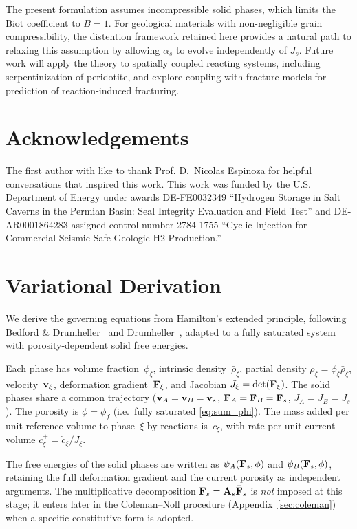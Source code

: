 \documentclass[11pt]{article}
\begin{document}
The present formulation assumes incompressible solid phases, which limits the Biot coefficient to $B = 1$.  For geological materials with non-negligible grain compressibility, the distention framework retained here provides a natural path to relaxing this assumption by allowing $\alpha_s$ to evolve independently of $J_s$.  Future work will apply the theory to spatially coupled reacting systems, including serpentinization of peridotite, and explore coupling with fracture models for prediction of reaction-induced fracturing.

\section{Acknowledgements}
The first author with like to thank Prof. D.~Nicolas Espinoza for helpful conversations that inspired this work. This work was funded by the U.S. Department of Energy under awards DE-FE0032349 ``Hydrogen Storage in Salt Caverns in the Permian Basin: Seal Integrity Evaluation and Field Test'' and DE-AR0001864283 assigned
control number 2784-1755 ``Cyclic Injection for Commercial Seismic-Safe Geologic H2 Production.''
\appendix
\section{Variational Derivation}
\label{sec:variational}

We derive the governing equations from Hamilton's extended principle, following Bedford \& Drumheller~\cite{drumheller1980thermomechanical} and Drumheller~\cite{drumheller2000}, adapted to a fully saturated system with porosity-dependent solid free energies.

Each phase has volume fraction~$\phi_\xi$, intrinsic density~$\bar\rho_\xi$, partial density $\rho_\xi = \phi_\xi\bar\rho_\xi$, velocity~$\mathbf{v}_\xi$, deformation gradient~$\mathbf{F}_\xi$, and Jacobian $J_\xi = \det(\mathbf{F}_\xi)$.  The solid phases share a common trajectory ($\mathbf{v}_A = \mathbf{v}_B = \mathbf{v}_s$, $\mathbf{F}_A = \mathbf{F}_B = \mathbf{F}_s$, $J_A = J_B = J_s$).  The porosity is $\phi = \phi_f$ (i.e.\ fully saturated \eqref{eq:sum_phi}).  The mass added per unit reference volume to phase~$\xi$ by reactions is~$c_\xi$, with rate per unit current volume $c^+_\xi = \dot{c}_\xi / J_\xi$.

The free energies of the solid phases are written as $\psi_A(\mathbf{F}_s, \phi)$ and $\psi_B(\mathbf{F}_s, \phi)$, retaining the full deformation gradient and the current porosity as independent arguments.  The multiplicative decomposition $\mathbf{F}_s = \mathbf{A}_s \mathbf{\bar F}_s$ is \emph{not} imposed at this stage; it enters later in the Coleman--Noll procedure (Appendix~\ref{sec:coleman}) when a specific constitutive form is adopted.
\end{document}
